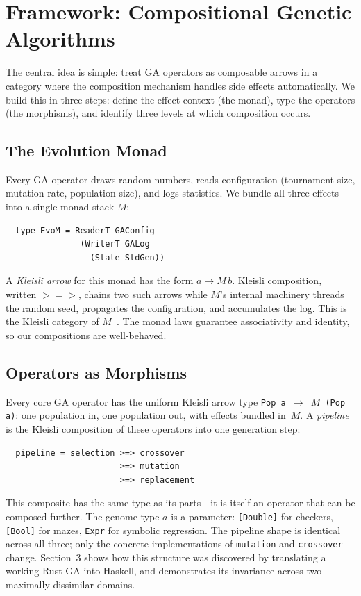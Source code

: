 \documentclass[dvipsnames,format=sigconf,anonymous=true,review=false]{acmart}
\begin{document}
\section{Framework: Compositional Genetic Algorithms}

The central idea is simple: treat GA operators as composable arrows in a category where the composition mechanism handles side effects automatically. We build this in three steps: define the effect context (the monad), type the operators (the morphisms), and identify three levels at which composition occurs.

\subsection{The Evolution Monad}

Every GA operator draws random numbers, reads configuration (tournament size, mutation rate, population size), and logs statistics. We bundle all three effects into a single monad stack $M$:

\begin{verbatim}
  type EvoM = ReaderT GAConfig
               (WriterT GALog
                 (State StdGen))
\end{verbatim}

\noindent A \emph{Kleisli arrow} for this monad has the form $a \to M\,b$. Kleisli composition, written $\mathbin{>\!\!=\!\!>}$, chains two such arrows while $M$'s internal machinery threads the random seed, propagates the configuration, and accumulates the log. This is the Kleisli category of $M$~\cite{maclane1971categories, moggi1991notions}. The monad laws guarantee associativity and identity, so our compositions are well-behaved.

\subsection{Operators as Morphisms}

Every core GA operator has the uniform Kleisli arrow type \texttt{Pop\,a $\to$ $M$\,(Pop\,a)}: one population in, one population out, with effects bundled in~$M$. A \emph{pipeline} is the Kleisli composition of these operators into one generation step:

\begin{verbatim}
  pipeline = selection >=> crossover
                       >=> mutation
                       >=> replacement
\end{verbatim}

\noindent This composite has the same type as its parts---it is itself an operator that can be composed further. The genome type $a$ is a parameter: \texttt{[Double]} for checkers, \texttt{[Bool]} for mazes, \texttt{Expr} for symbolic regression. The pipeline shape is identical across all three; only the concrete implementations of \texttt{mutation} and \texttt{crossover} change. Section~3 shows how this structure was discovered by translating a working Rust GA into Haskell, and demonstrates its invariance across two maximally dissimilar domains.
\end{document}
